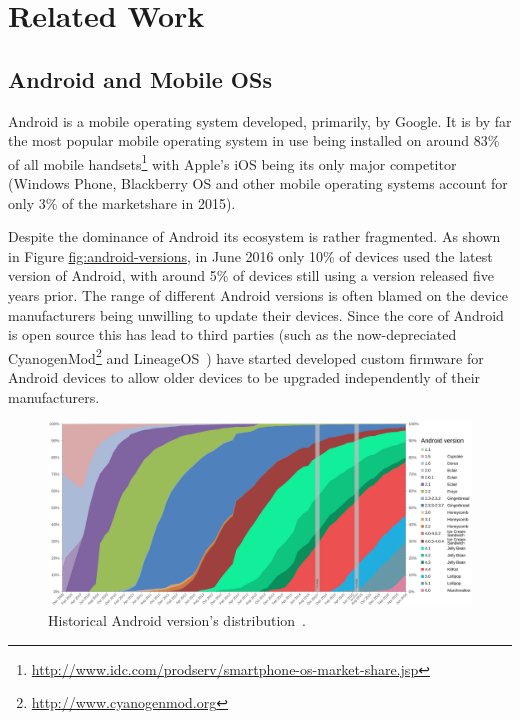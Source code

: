 \documentclass[thesis.tex]{subfiles}
\begin{document}
\chapter{Related Work}
\label{chap:related-work}

\section{Android and Mobile OSs}\label{android}

Android is a mobile operating system developed, primarily, by Google. It is by
far the most popular mobile operating system in use being installed on around
83\% of all mobile
handsets\footnote{\url{http://www.idc.com/prodserv/smartphone-os-market-share.jsp}}
with Apple's iOS being its only major competitor (Windows Phone, Blackberry OS
and other mobile operating systems account for only 3\% of the marketshare in
2015).

Despite the dominance of Android its ecosystem is rather fragmented. As shown in
Figure \url{fig:android-versions}, in June 2016 only 10\% of devices used the
latest version of Android, with around 5\% of devices still using a version
released five years prior. The range of different Android versions is often
blamed on the device manufacturers being unwilling to update their devices.
Since the core of Android is open source this has lead to third parties (such as the now-depreciated
CyanogenMod\footnote{\url{http://www.cyanogenmod.org}} and LineageOS~\cite{lineageos_lineageos_2017}) have started developed
custom firmware for Android devices to allow older devices to be upgraded
independently of their manufacturers.

\begin{figure}
\centering
\includegraphics[width=\linewidth]{figures/android-versions.pdf}
\caption[Historical Android version's distribution.]{Historical Android
  version's distribution~\cite{erikrespo_android_2017}.}
\label{fig:android-versions}
\end{figure}
\end{document}
